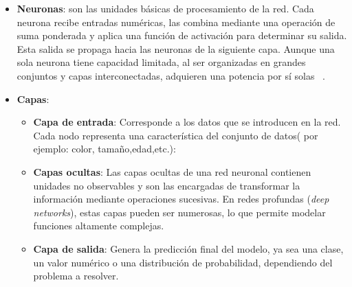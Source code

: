 \documentclass[11pt]{article} %
\begin{document}
\begin{itemize}
    \item\textbf{Neuronas}: son las unidades básicas de procesamiento de la red. Cada neurona recibe entradas numéricas, las combina mediante una operación de suma ponderada y aplica una función de activación para determinar su salida. Esta salida se propaga hacia las neuronas de la siguiente capa. Aunque una sola neurona tiene capacidad limitada, al ser organizadas en grandes conjuntos y capas interconectadas, adquieren una potencia por sí solas ~\cite{datacamp_redes}.

    \item\textbf{Capas}:
    \begin{itemize}
        \item \textbf{Capa de entrada}: Corresponde a los datos que se introducen en la red. Cada nodo representa una característica del conjunto de datos( por ejemplo: color, tamaño,edad,etc.):
        \item\textbf{Capas ocultas}: Las capas ocultas de una red neuronal contienen unidades no observables y son las encargadas de transformar la información mediante operaciones sucesivas. En redes profundas (\textit{deep networks}), estas capas pueden ser numerosas, lo que permite modelar funciones altamente complejas.
        \item\textbf{Capa de salida}: Genera la predicción final del modelo, ya sea una clase, un valor numérico o una distribución de probabilidad, dependiendo del problema a resolver.
    \end{itemize}


\end{itemize}
\end{document}
